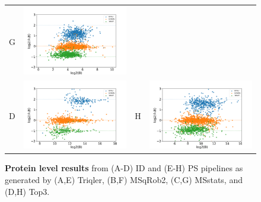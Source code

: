 \documentclass[11pt]{article}
\begin{document}
\begin{figure}[hbt]
\begin{tabular}{lclc}
        G & \includegraphics[width=0.4\linewidth]{../../result/report_plots_pipeline/scatter_PS_msstats.png} \\ 
        D & \includegraphics[width=0.4\linewidth]{../../result/report_plots_pipeline/scatter_ID_top3.png} &
        H & \includegraphics[width=0.4\linewidth]{../../result/report_plots_pipeline/scatter_PS_top3.png} 
    \end{tabular}
    \caption{{\bf Protein level results} from (A-D) ID and (E-H) PS pipelines as generated by 
    (A,E) Triqler, (B,F) MSqRob2, (C,G) MSstats, and (D,H) Top3. \label{fig:fc_scatter_supplement}}
\end{figure}
\end{document}
